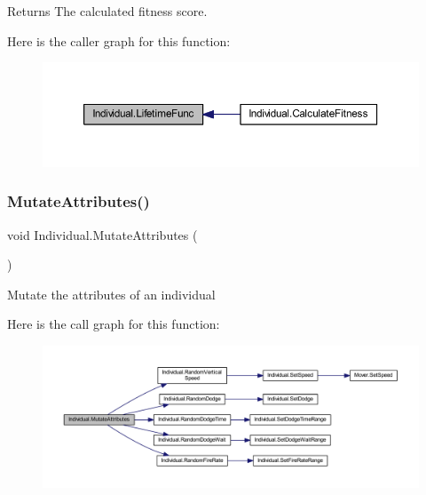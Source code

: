 \begin{DoxyReturn}{Returns}
The calculated fitness score.
\end{DoxyReturn}
Here is the caller graph for this function\+:\nopagebreak
\begin{figure}[H]
\begin{center}
\leavevmode
\includegraphics[width=350pt]{class_individual_af40ad69dad043da7061c07856b6f1457_icgraph}
\end{center}
\end{figure}
\mbox{\label{class_individual_a2b19324cd6e712330c4d1601c95dcffd}} 
\subsubsection{\texorpdfstring{Mutate\+Attributes()}{MutateAttributes()}}
{\footnotesize\ttfamily void Individual.\+Mutate\+Attributes (\begin{DoxyParamCaption}{ }\end{DoxyParamCaption})}



Mutate the attributes of an individual 

Here is the call graph for this function\+:\nopagebreak
\begin{figure}[H]
\begin{center}
\leavevmode
\includegraphics[width=350pt]{class_individual_a2b19324cd6e712330c4d1601c95dcffd_cgraph}
\end{center}
\end{figure}
\mbox{\label{class_individual_af2d68c02add2e5e553959003e8180a9d}} 
